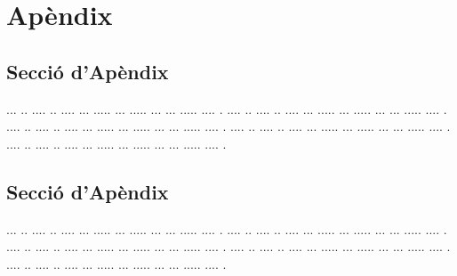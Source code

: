 ﻿\documentclass[10pt,a4paper,twocolumn,twoside]{article}
\begin{document}
\appendix

\section*{Apèndix}

\setcounter{section}{1}

\subsection{Secció d'Apèndix}


... ..  .... .. .... ... ..... ... ..... ... ... ..... .... .
.... ..  .... .. .... ... ..... ... ..... ... ... ..... .... .
.... ..  .... .. .... ... ..... ... ..... ... ... ..... .... .
.... ..  .... .. .... ... ..... ... ..... ... ... ..... .... .
.... ..  .... .. .... ... ..... ... ..... ... ... ..... .... .

\subsection{Secció d'Apèndix}


... ..  .... .. .... ... ..... ... ..... ... ... ..... .... .
.... ..  .... .. .... ... ..... ... ..... ... ... ..... .... .
.... ..  .... .. .... ... ..... ... ..... ... ... ..... .... .
.... ..  .... .. .... ... ..... ... ..... ... ... ..... .... .
.... ..  .... .. .... ... ..... ... ..... ... ... ..... .... .
\end{document}
